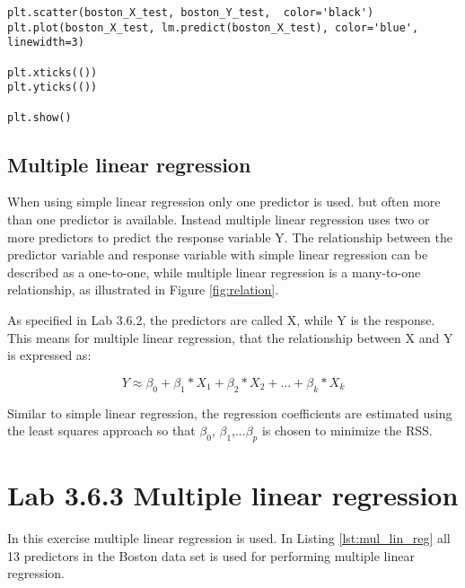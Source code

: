 \begin{lstlisting}[caption={Python Plotting of Linear Regression function}, label=lst:lin_reg_plot, mathescape=true]
plt.scatter(boston_X_test, boston_Y_test,  color='black')
plt.plot(boston_X_test, lm.predict(boston_X_test), color='blue',
linewidth=3)

plt.xticks(())
plt.yticks(())

plt.show()
\end{lstlisting}


\subsection{Multiple linear regression}

When using simple linear regression only one predictor is used. but often more than one predictor is available. Instead multiple linear regression uses two or more predictors to predict the response variable Y. The relationship between the predictor variable and response variable with simple linear regression can be described as a one-to-one, while multiple linear regression is a many-to-one relationship, as illustrated in Figure \ref{fig:relation}.


\FloatBarrier
As specified in Lab 3.6.2, the predictors are called X, while Y is the response. This means for multiple linear regression, that the relationship between X and Y is expressed as:

\begin{equation}
Y \approx \beta_0 + \beta_1 * X_1 + \beta_2 * X_2 + … + \beta_k * X_k
\end{equation}

Similar to simple linear regression, the regression coefficients are estimated using the least squares approach so that $\beta_0$, $\beta_1$,...$\beta_p$ is chosen to minimize the RSS.

\section{Lab 3.6.3 Multiple linear regression}

In this exercise multiple linear regression is used. In Listing \ref{lst:mul_lin_reg} all 13 predictors in the Boston data set is used for performing multiple linear regression.

